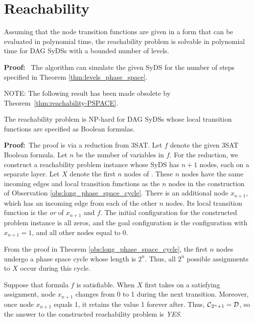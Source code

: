 \section{Reachability}
\label{sec:reachability}


\smallskip
\begin{theorem}\label{thm:reachability_bounded_levels}
Assuming that the node transition functions are given in a form 
that can be evaluated in polynomial time,
the reachability problem is solvable in polynomial time
for DAG SyDSs with a bounded number of levels.
\end{theorem}

\noindent
\textbf{Proof:}~ 
The algorithm can simulate the given SyDS for the number of steps specified in 
Theorem \ref{thm:levels_phase_space}.
\QED

\bigskip

NOTE: The following result has been made obsolete by 
Theorem~\ref{thm:reachability-PSPACE}.

\smallskip
\begin{theorem}\label{thm:reachability-NP}
The reachability problem is NP-hard for DAG SyDSs 
whose local transition functions are specified as Boolean formulas.
\end{theorem}

\noindent
\textbf{Proof:}~The proof is via a reduction from 3SAT.
Let $f$ denote the given 3SAT Boolean formula.
Let $n$ be the number of variables in $f$.
For the reduction, we construct a reachability problem instance whose SyDS \cals{} has $n+1$ nodes,
each on a separate layer.
Let $X$ denote the first $n$ nodes of \cals{}.
These $n$ nodes have the same incoming edges and local transition functions 
as the $n$ nodes in the construction of Observation \ref{obs:long_phase_space_cycle}.
There is an additional node $x_{n+1}$,
which has an incoming edge from each of the other $n$  nodes.
Its local transition function is the {\em or} of $x_{n+1}$ and $f$.
The initial configuration \calc{} for the constructed problem instance is all zeros,
and the goal configuration \cald{} is the configuration with $x_{n+1} = 1$,
and all other nodes equal to 0.

From the proof in Theorem \ref{obs:long_phase_space_cycle}, 
the first $n$ nodes undergo a phase space cycle whose length is $2^n$.
Thus, all $2^n$ possible assignments to $X$ occur during this cycle.

Suppose that formula $f$ is satisfiable. 
When $X$ first takes on a satisfying assignment,
node $x_{n+1}$ changes from 0 to 1 during the next transition.
Moreover, once node $x_{n+1}$ equals 1, it retains the value 1 forever after.
Thus, $\mbox{$\mathcal{C}$}_{2^n+1} = \mbox{$\mathcal{D}$}$, so the answer to the constructed reachability problem is {\em YES}.

